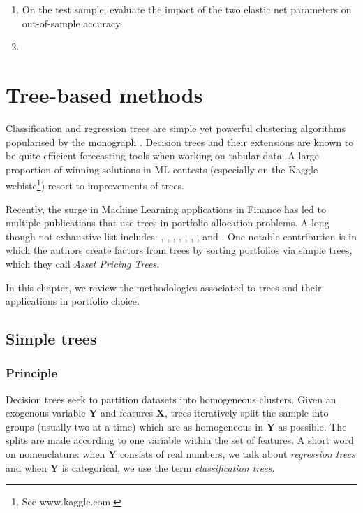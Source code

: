 \documentclass[]{krantz}
\let\rmarkdownfootnote\footnote%
\def\footnote{\protect\rmarkdownfootnote}
\theoremstyle{definition}
\theoremstyle{definition}
\theoremstyle{definition}
\theoremstyle{remark}
\begin{document}
\begin{enumerate}
\def\labelenumi{\arabic{enumi}.}
\item
  On the test sample, evaluate the impact of the two elastic net
  parameters on out-of-sample accuracy.\\
\item
\end{enumerate}

\hypertarget{trees}{%
\chapter{Tree-based methods}\label{trees}}

\label{sec:trees}

Classification and regression trees are simple yet powerful clustering
algorithms popularised by the monograph
\citet{breiman1984classification}. Decision trees and their extensions
are known to be quite efficient forecasting tools when working on
tabular data. A large proportion of winning solutions in ML contests
(especially on the Kaggle webiste\footnote{See www.kaggle.com. }) resort
to improvements of trees.

Recently, the surge in Machine Learning applications in Finance has led
to multiple publications that use trees in portfolio allocation
problems. A long though not exhaustive list includes:
\citet{ballings2015evaluating}, \citet{patel2015predicting},
\citet{patel2015bpredicting}, \citet{moritz2016tree},
\citet{krauss2017deep}, \citet{gu2018empirical}, \citet{guida2019big},
\citet{coqueret2019training} and \citet{simonian2019machine}. One
notable contribution is \citet{bryzgalova2019forest} in which the
authors create factors from trees by sorting portfolios via simple
trees, which they call \emph{Asset Pricing Trees}.

In this chapter, we review the methodologies associated to trees and
their applications in portfolio choice.

\hypertarget{simple-trees}{%
\section{Simple trees}\label{simple-trees}}

\hypertarget{principle}{%
\subsection{Principle}\label{principle}}

Decision trees seek to partition datasets into homogeneous clusters.
Given an exogenous variable \(\mathbf{Y}\) and features \(\mathbf{X}\),
trees iteratively split the sample into groups (usually two at a time)
which are as homogeneous in \(\mathbf{Y}\) as possible. The splits are
made according to one variable within the set of features. A short word
on nomenclature: when \(\mathbf{Y}\) consists of real numbers, we talk
about \emph{regression trees} and when \(\mathbf{Y}\) is categorical, we
use the term \emph{classification trees}.
\end{document}

